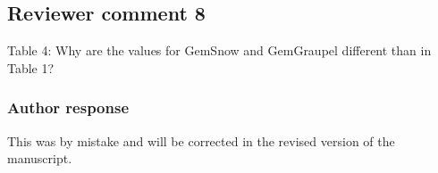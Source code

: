\documentclass[11pt]{scrartcl}
\begin{document}
\begin{itemize}


\subsection*{Reviewer comment 8}

Table 4: Why are the values for GemSnow and GemGraupel different than in Table 1?

\subsubsection*{Author response}

This was by mistake and will be corrected in the revised version of the
manuscript.


\end{itemize}
\end{document}
